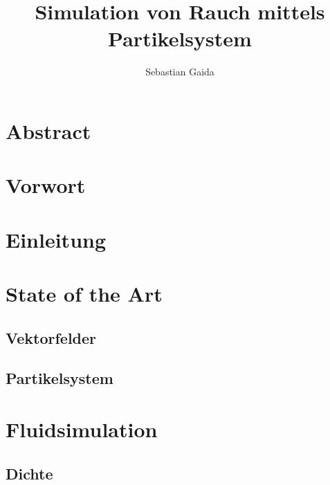 \documentclass[intern,palatino]{cgBA}
\author{Sebastian Gaida}
\title{Simulation von Rauch mittels Partikelsystem}
\begin{document}
	\maketitle
	\newpage
	\tableofcontents
	\clearpage         %
	


\section*{Abstract}


\section{Vorwort}


\section{Einleitung}


\section{State of the Art}
\subsection{Vektorfelder}
\subsection{Partikelsystem}


\section{Fluidsimulation}
\subsection{Dichte}
\end{document}
